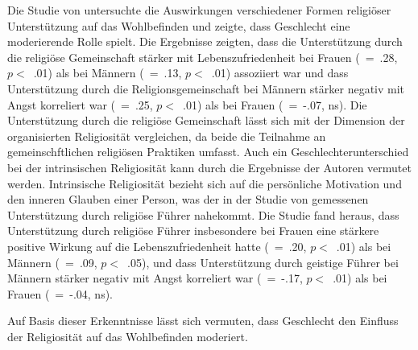 
Die Studie von \textcite{LazarBjorck2016} untersuchte die Auswirkungen verschiedener Formen religiöser Unterstützung auf das Wohlbefinden und zeigte, dass Geschlecht eine moderierende Rolle spielt. Die Ergebnisse zeigten, dass die Unterstützung durch die religiöse Gemeinschaft stärker mit Lebenszufriedenheit bei Frauen (\textbeta~=~.28, $p<$~.01) als bei Männern (\textbeta~=~.13, $p<$~.01) assoziiert war und dass Unterstützung durch die Religionsgemeinschaft bei Männern stärker negativ mit Angst korreliert war (\textbeta~=~.25, $p<$~.01) als bei Frauen (\textbeta~=~-.07, ns). Die Unterstützung durch die religiöse Gemeinschaft lässt sich mit der Dimension der organisierten Religiosität vergleichen, da beide die Teilnahme an gemeinschftlichen religiösen Praktiken umfasst.
Auch ein Geschlechterunterschied bei der intrinsischen Religiosität kann durch die Ergebnisse der Autoren vermutet werden. Intrinsische Religiosität bezieht sich auf die persönliche Motivation und den inneren Glauben einer Person, was der in der Studie von \textcite{LazarBjorck2016} gemessenen Unterstützung durch religiöse Führer nahekommt. Die Studie fand heraus, dass Unterstützung durch religiöse Führer insbesondere bei Frauen eine stärkere positive Wirkung auf die Lebenszufriedenheit hatte (\textbeta~=~.20, $p<$~.01) als bei Männern (\textbeta~=~.09, $p<$~.05), und dass Unterstützung durch geistige Führer bei Männern stärker negativ mit Angst korreliert war (\textbeta~=~-.17, $p<$~.01) als bei Frauen (\textbeta~=~-.04, ns).

Auf Basis dieser Erkenntnisse lässt sich vermuten, dass Geschlecht den Einfluss der Religiosität auf das Wohlbefinden moderiert. 



